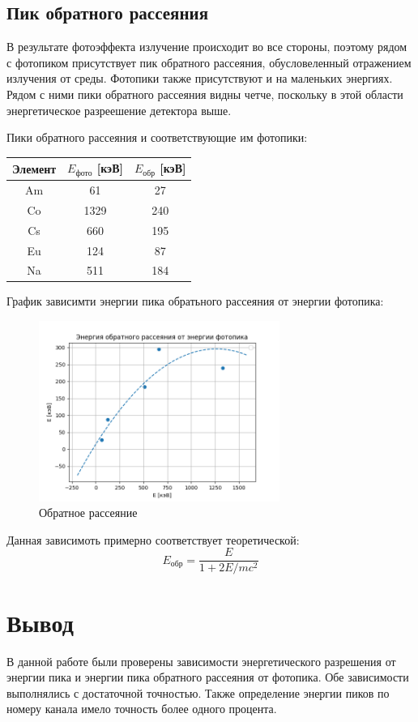 \documentclass[a4paper,12pt]{article} %
\begin{document}
		\subsection*{Пик обратного рассеяния}
			В результате фотоэффекта излучение происходит во все стороны, поэтому рядом с фотопиком присутствует пик обратного рассеяния, обусловеленный отражением излучения от среды.
			Фотопики также присутствуют и на маленьких энергиях.
			Рядом с ними пики обратного рассеяния видны четче, поскольку в этой области энергетическое разреешение детектора выше.\par
			Пики обратного рассеяния и соответствующие им фотопики:
			\begin{table}[h!]
				\centering
				\begin{tabular}{|c|c|c|}
				\hline
				Элемент & $E_\text{фото}$ [кэВ] & $E_{\text{обр}}$ [кэВ] \\ \hline
				Am      & 61                         & 27                         \\ \hline
				Co      & 1329                       & 240                        \\ \hline
				Cs      & 660                        & 195                        \\ \hline
				Eu      & 124                        & 87                         \\ \hline
				Na      & 511                        & 184                        \\ \hline
				\end{tabular}
			\end{table}\par
			График зависимти энергии пика обратьного рассеяния от энергии фотопика:
			\begin{figure}[h!]
				\includegraphics[width=0.7\textwidth]{img/Back.png}
				\centering
				\caption{Обратное рассеяние}
			\end{figure}\par
			Данная зависимоть примерно соответствует теоретической:
			\begin{equation}
				E_{\text{обр}} = \frac{E}{1 + 2 E / mc^2}
			\end{equation}
	\section{Вывод}
		В данной работе были проверены зависимости энергетического разрешения от энергии пика и энергии пика обратного рассеяния от фотопика.
		Обе зависимости выполнялись с достаточной точностью. 
		Также определение энергии пиков по номеру канала имело точность более одного процента.
\end{document}
